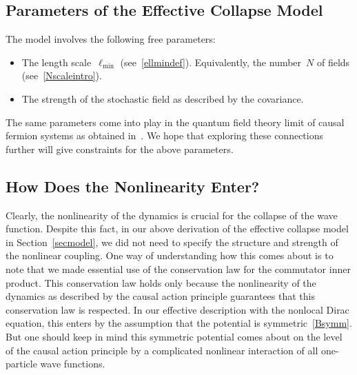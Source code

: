 \documentclass[reqno,11pt]{amsart}
\numberwithin{equation}{section}
\newcommand{\1}{\mathds{1}}
\newcommand{\itemD}{\item[{\raisebox{0.125em}{\tiny $\blacktriangleright$}}]}
\newcommand{\bitem}{\begin{itemize}[leftmargin=2.5em]}
\newcommand{\eitem}{\end{itemize}}
\newcommand\Felix[1]{}
\begin{document}
{\subsection{Parameters of the Effective Collapse Model} \label{secparameters}
The model involves the following free parameters:
\bitem
\itemD The length scale~$\ell_{\min}$ (see~\eqref{ellmindef}). Equivalently, the number~$N$ of fields
(see~\eqref{Nscaleintro}).
\itemD The strength of the stochastic field as described by the covariance.
\eitem
The same parameters come into play in the quantum field theory limit of causal fermion systems
as obtained in~\cite{fockdynamics}. We hope that exploring these connections further will give
constraints for the above parameters.

\subsection{How Does the Nonlinearity Enter?} \label{secnonlin}
Clearly, the nonlinearity of the dynamics is crucial for the collapse of the wave function.
Despite this fact, in our above derivation of the effective collapse model in Section~\ref{secmodel},
we did not need to specify the structure and strength of the nonlinear coupling.
One way of understanding how this comes about is to note that we made essential use of the
conservation law for the commutator inner product. This conservation law holds only because the
nonlinearity of the dynamics as described by the causal action principle guarantees
that this conservation law is respected. In our effective description with the nonlocal Dirac equation, this
enters by the assumption that the potential is symmetric~\eqref{Bsymm}. But one should keep in mind
this symmetric potential comes about on the level of the causal action principle by a complicated nonlinear
interaction of all one-particle wave functions.

}
\end{document}
